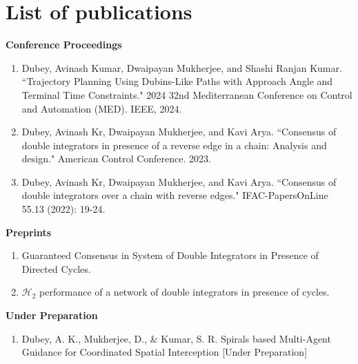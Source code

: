 \chapter*{List of publications}

{\bf Conference Proceedings}
\begin{enumerate}
	\item Dubey, Avinash Kumar, Dwaipayan Mukherjee, and Shashi Ranjan Kumar. ``Trajectory Planning Using Dubins-Like Paths with Approach Angle and Terminal Time Constraints." 2024 32nd Mediterranean Conference on Control and Automation (MED). IEEE, 2024.
	\item Dubey, Avinash Kr, Dwaipayan Mukherjee, and Kavi Arya. ``Consensus of double integrators in presence of a reverse edge in a chain: Analysis and design." American Control Conference. 2023.
	\item Dubey, Avinash Kr, Dwaipayan Mukherjee, and Kavi Arya. ``Consensus of double integrators over a chain with reverse edges." IFAC-PapersOnLine 55.13 (2022): 19-24.
\end{enumerate}

{\bf Preprints}
\begin{enumerate}
\item Guaranteed Consensus in System of Double Integrators in Presence of Directed Cycles.
\item $\mathcal{H}_2$ performance of a network of double integrators in presence of cycles.
\end{enumerate}

{\bf Under Preparation}
\begin{enumerate}
	\item Dubey, A. K., Mukherjee, D., \& Kumar, S. R. Spirals based Multi-Agent Guidance for Coordinated Spatial Interception [Under Preparation]
\end{enumerate}
